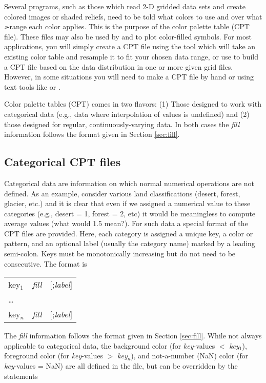 Several programs, such as those which read 2-D gridded data sets and create
colored images or shaded reliefs, need to be told what colors to use and
over what \emph{z}-range each color applies.  This is the purpose of the
color palette table (CPT file).  These files may also be used by 
and  to plot color-filled symbols.  For most applications, you
will simply create a CPT file using the tool  which will
take an existing color table and resample it to fit your chosen data
range, or use  to build a CPT file based on the data distribution
in one or more given grid files.  However, in some situations you will need to make a CPT file by
hand or using text tools like  or .

Color palette tables (CPT) comes in two flavors: (1) Those designed to work with
categorical data (e.g., data where interpolation of values is undefined) and
(2) those designed for regular, continuously-varying data.  In both cases
the \emph{fill} information follows the format given in Section \ref{sec:fill}.

\subsection{Categorical CPT files}

Categorical data are information on which normal numerical operations are not
defined. As an example, consider various land classifications (desert, forest, glacier, etc.)
and it is clear that even if we assigned a numerical value to these categories (e.g.,
desert = 1, forest = 2, etc) it would be meaningless to compute average values (what would
1.5 mean?).  For such data a special format of the CPT files are provided.  Here,
each category is assigned a unique key, a color or pattern, and an optional
label (usually the category name) marked by a leading semi-colon.  Keys must be
monotonically increasing but do not need to be consecutive.  The format is

\begin{center}
\begin{tabular}{lll}
key$_1$ &  \emph{fill} &  [;\emph{label}] \\ 
\ldots & & \\ 
key$_n$ &  \emph{fill} &  [;\emph{label}] \\ 
\end{tabular} 
\end{center}

The \emph{fill} information follows the format given in Section \ref{sec:fill}.
While not always applicable to categorical data, the background color (for
\emph{key}-values $<$ \emph{key$_1$}), foreground color
(for \emph{key}-values $>$ \emph{key$_{n}$}), and not-a-number (NaN) color (for
\emph{key}-values = NaN) are all defined in the 
file, but can be overridden by the statements

